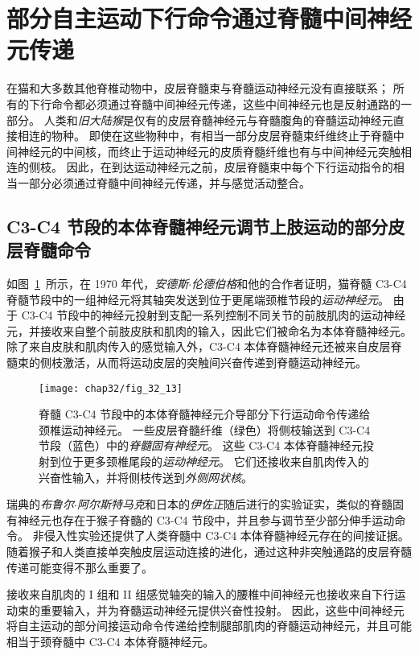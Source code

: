 \section{部分自主运动下行命令通过脊髓中间神经元传递}

在猫和大多数其他脊椎动物中，皮层脊髓束与脊髓运动神经元没有直接联系；
所有的下行命令都必须通过脊髓中间神经元传递，这些中间神经元也是反射通路的一部分。
人类和\textit{旧大陆猴}是仅有的皮层脊髓神经元与脊髓腹角的脊髓运动神经元直接相连的物种。
即使在这些物种中，有相当一部分皮层脊髓束纤维终止于脊髓中间神经元的中间核，而终止于运动神经元的皮质脊髓纤维也有与中间神经元突触相连的侧枝。
因此，在到达运动神经元之前，皮层脊髓束中每个下行运动指令的相当一部分必须通过脊髓中间神经元传递，并与感觉活动整合。



\subsection{C3-C4 节段的本体脊髓神经元调节上肢运动的部分皮层脊髓命令}

如图~\ref{fig:32_13}~所示，在 1970 年代，\textit{安德斯$\cdot$伦德伯格}和他的合作者证明，猫脊髓 C3-C4 脊髓节段中的一组神经元将其轴突发送到位于更尾端颈椎节段的\textit{运动神经元}。
由于 C3-C4 节段中的神经元投射到支配一系列控制不同关节的前肢肌肉的运动神经元，并接收来自整个前肢皮肤和肌肉的输入，因此它们被命名为本体脊髓神经元。
除了来自皮肤和肌肉传入的感觉输入外，C3-C4 本体脊髓神经元还被来自皮层脊髓束的侧枝激活，从而将运动皮层的突触间兴奋传递到脊髓运动神经元。


\begin{figure}[htbp]
	\centering
	\texttt{[image: chap32/fig\_32\_13]}
	\caption{脊髓 C3-C4 节段中的本体脊髓神经元介导部分下行运动命令传递给颈椎运动神经元。
		一些皮层脊髓纤维（绿色）将侧枝输送到 C3-C4 节段（蓝色）中的\textit{脊髓固有神经元}。
		这些 C3-C4 本体脊髓神经元投射到位于更多颈椎尾段的\textit{运动神经元}。
		它们还接收来自肌肉传入的兴奋性输入，并将侧枝传送到\textit{外侧网状核}。}
	\label{fig:32_13}
\end{figure}


瑞典的\textit{布鲁尔$\cdot$阿尔斯特马克}和日本的\textit{伊佐正}随后进行的实验证实，类似的脊髓固有神经元也存在于猴子脊髓的 C3-C4 节段中，并且参与调节至少部分伸手运动命令。
非侵入性实验还提供了人类脊髓中 C3-C4 本体脊髓神经元存在的间接证据。
随着猴子和人类直接单突触皮层运动连接的进化，通过这种非突触通路的皮层脊髓传递可能变得不那么重要了。


接收来自肌肉的 I 组和 II 组感觉轴突的输入的腰椎中间神经元也接收来自下行运动束的重要输入，并为脊髓运动神经元提供兴奋性投射。
因此，这些中间神经元将自主运动的部分间接运动命令传递给控制腿部肌肉的脊髓运动神经元，并且可能相当于颈脊髓中 C3-C4 本体脊髓神经元。



